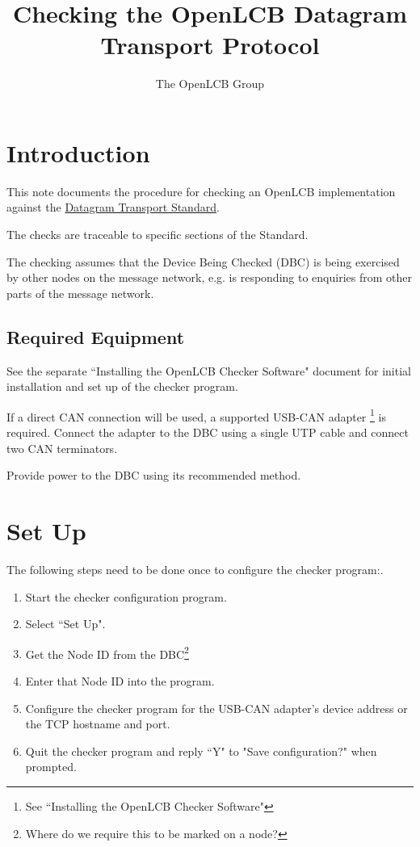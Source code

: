 \documentclass[11pt]{article}
\title{Checking the OpenLCB Datagram Transport Protocol}
\author{The OpenLCB Group}
\begin{document}
\maketitle


\section{Introduction}

This note documents the procedure for checking an OpenLCB implementation against the 
\href{https://nbviewer.org/github/openlcb/documents/blob/master/standards/DatagramTransportS.pdf}{Datagram Transport Standard}.

The checks are traceable to specific sections of the Standard.

The checking assumes that the Device Being Checked (DBC) is being exercised by other
nodes on the message network, 
e.g. is responding to enquiries from other parts of the message network.

\subsection{Required Equipment}

See the separate ``Installing the OpenLCB Checker Software" document for initial installation 
and set up of the checker program.

If a direct CAN connection will be used,
a supported USB-CAN adapter
    \footnote{See ``Installing the OpenLCB Checker Software"}
is required. 
Connect the adapter to the DBC using a single UTP cable and connect two CAN terminators.

Provide power to the DBC using its recommended method.

\section{Set Up}
The following steps need to be done once to configure the checker program:.
\begin{enumerate}
\item Start the checker configuration program. 
\item Select ``Set Up".
\item Get the Node ID from the DBC\footnote{Where do we require this to be marked on a node?} 
\item Enter that Node ID into the program.
\item Configure the checker program for the USB-CAN adapter's device address
        or the TCP hostname and port.
\item Quit the checker program and reply ``Y" to "Save configuration?" when prompted.
\end{enumerate}
\end{document}
